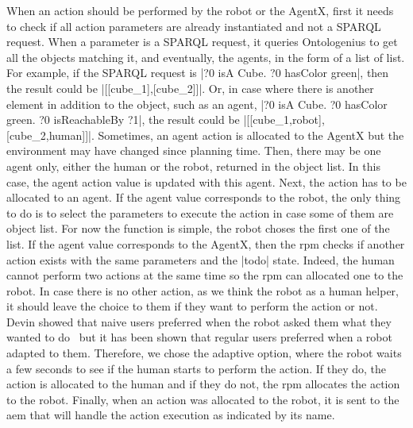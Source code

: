 \documentclass[a4paper,11pt,twoside]{StyleThese}
\begin{document}
When an action should be performed by the robot or the AgentX, first it needs to check if all action parameters are already instantiated and not a SPARQL request. When a parameter is a SPARQL request, it queries Ontologenius to get all the objects matching it, and eventually, the agents, in the form of a list of list. For example, if the SPARQL request is |?0 isA Cube. ?0 hasColor green|, then the result could be |[[cube\_1],[cube\_2]]|. Or, in case where there is another element in addition to the object, such as an agent, \eg |?0 isA Cube. ?0 hasColor green. ?0 isReachableBy ?1|, the result could be |[[cube\_1,robot],[cube\_2,human]]|. Sometimes, an agent action is allocated to the AgentX but the environment may have changed since planning time. Then, there may be one agent only, either the human or the robot, returned in the object list. In this case, the agent action value is updated with this agent. Next, the action has to be allocated to an agent. If the agent value corresponds to the robot, the only thing to do is to select the parameters to execute the action in case some of them are object list. For now the function is simple, the robot choses the first one of the list. If the agent value corresponds to the AgentX, then the \acrshort{rpm} checks if another action exists with the same parameters and the |todo| state. Indeed, the human cannot perform two actions at the same time so the \acrshort{rpm} can allocated one to the robot. In case there is no other action, as we think the robot as a human helper, it should leave the choice to them if they want to perform the action or not. Devin showed that naive users preferred when the robot asked them what they wanted to do~\cite{devin_2017_decisions} but it has been shown that regular users preferred when a robot adapted to them. Therefore, we chose the adaptive option, where the robot waits a few seconds to see if the human starts to perform the action. If they do, the action is allocated to the human and if they do not, the \acrshort{rpm} allocates the action to the robot. Finally, when an action was allocated to the robot, it is sent to the \acrlong{aem} that will handle the action execution as indicated by its name.
\end{document}
